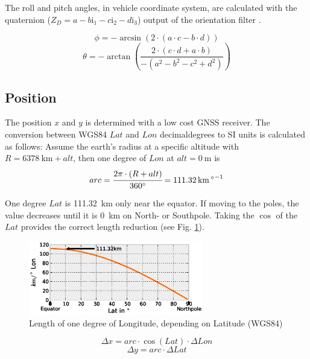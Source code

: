 \documentclass[a4paper,twoside]{article}
\begin{document}
The roll and pitch angles, in vehicle coordinate system, are calculated with the quaternion ($Z_D=a-b\mathrm{i}_1-c\mathrm{i}_2-d\mathrm{i}_3$) output of the orientation filter \cite{Buchholz2013}.

\begin{equation}\label{rollangle}\phi = -\arcsin(2\cdot(a\cdot c - b \cdot d))\end{equation}
\begin{equation}\label{pitchangle}\theta = -\arctan\left(\frac{2\cdot(c\cdot d + a\cdot b)}{-(a^2-b^2-c^2+d^2)}\right)\end{equation}

\subsection{Position}

\noindent The position $x$ and $y$ is determined with a low cost GNSS receiver. The conversion between WGS84 $Lat$ and $Lon$ decimaldegrees to SI units is calculated as follows:
Assume the earth's radius at a specific altitude with $R=\SI{6378}{\kilo\metre}+alt$, then one degree of $Lon$ at $alt=\SI{0}{\metre}$ is
\begin{equation}arc = \cfrac{2 \pi\cdot (R+alt)}{\SI{360}{\degree}} =  \SI{111.32}{\kilo\metre\per\degree}\end{equation}

One degree $Lat$ is \SI{111.32}{\kilo\metre} only near the equator. If moving to the poles, the value decreases until it is \SI{0}{\kilo\metre} on North- or Southpole. Taking the $\cos$ of the $Lat$ provides the correct length reduction (see Fig. \ref{LonLatEquatorNorthpole}).

\begin{figure}[ht]
\centering
\includegraphics[width=3.0in]{images/Longitude-Cos-Latitude-Equator-Northpole}
\caption{Length of one degree of Longitude, depending on Latitude (WGS84)}
\label{LonLatEquatorNorthpole}
\end{figure}

\begin{equation}\label{deltax}\Delta x = arc\cdot\cos(Lat)\cdot\Delta Lon\end{equation}
\begin{equation}\label{deltay}\Delta y = arc\cdot\Delta Lat\end{equation}
\end{document}

